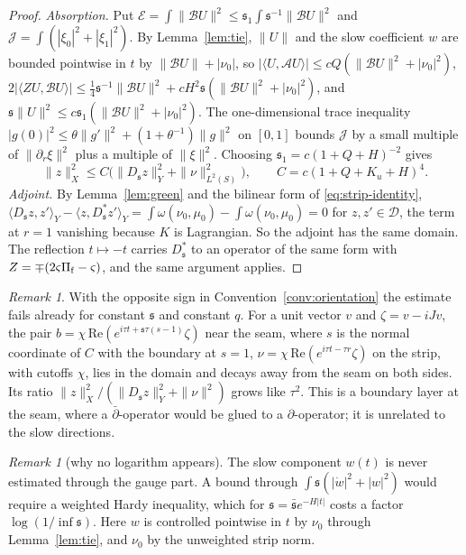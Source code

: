 \documentclass[11pt]{amsart}
\theoremstyle{definition}
\theoremstyle{remark}
\newtheorem{remark}[theorem]{Remark}
\theoremstyle{plain}
\numberwithin{equation}{section}
\begin{document}
\begin{proof}
\emph{Absorption.} Put $\mathcal E=\int\|\mathcal BU\|^2\le{\mathfrak s}_1\int
{\mathfrak s}^{-1}\|\mathcal BU\|^2$ and $\mathcal J=\int(|\xi_0|^2+|\xi_1|^2)$.
By Lemma~\ref{lem:tie}, $\|U\|$ and the slow coefficient $w$ are bounded
pointwise in $t$ by $\|\mathcal BU\|+|\nu_0|$, so
$|\langle U,\mathcal AU\rangle|\le cQ(\|\mathcal BU\|^2+|\nu_0|^2)$,
$2|\langle ZU,\mathcal BU\rangle|\le\tfrac14{\mathfrak s}^{-1}\|\mathcal BU\|^2
+cH^2{\mathfrak s}(\|\mathcal BU\|^2+|\nu_0|^2)$, and ${\mathfrak s}\|U\|^2\le
c{\mathfrak s}_1(\|\mathcal BU\|^2+|\nu_0|^2)$. The one-dimensional trace
inequality $|g(0)|^2\le\theta\|g'\|^2+(1+\theta^{-1})\|g\|^2$ on $[0,1]$
bounds $\mathcal J$ by a small multiple of $\|\partial_r\xi\|^2$ plus a
multiple of $\|\xi\|^2$. Choosing ${\mathfrak s}_1=c(1+Q+H)^{-2}$ gives
\[
\|z\|_X^2\le C\bigl(\|D_{\mathfrak s} z\|_Y^2+\|\nu\|_{L^2(S)}^2\bigr),\qquad
C=c(1+Q+K_u+H)^4 .
\]
\emph{Adjoint.} By Lemma~\ref{lem:green} and the bilinear form of
\eqref{eq:strip-identity}, $\langle D_{\mathfrak s} z,z'\rangle_Y-\langle
z,D_{\mathfrak s}^*z'\rangle_Y=\int\omega(\nu_0,\mu_0)-\int\omega(\nu_0,\mu_0)=0$
for $z,z'\in\mathcal D$, the term at $r=1$ vanishing because $K$ is
Lagrangian. So the adjoint has the same domain. The reflection
$t\mapsto-t$ carries $D_{\mathfrak s}^*$ to an operator of the same form with
$Z=\mp(2\varsigma\Pi_{\rm f}-\varsigma)$, and the same argument applies.
\end{proof}

\begin{remark}\label{rem:wrong-sign}
With the opposite sign in Convention~\ref{conv:orientation} the
estimate fails already for constant ${\mathfrak s}$ and constant $q$. For a
unit vector $v$ and $\zeta=v-iJv$, the pair
$b=\chi\,\mathrm{Re}(e^{i\tau t+{\mathfrak s}\tau(s-1)}\zeta)$ near the seam, where $s$ is the
normal coordinate of $C$ with the boundary at $s=1$,
$\nu=\chi\,\mathrm{Re}(e^{i\tau t-\tau r}\zeta)$ on the strip, with
cutoffs $\chi$, lies in the domain and decays away from the seam on both
sides. Its ratio $\|z\|_X^2/(\|D_{\mathfrak s} z\|_Y^2+\|\nu\|^2)$ grows like
$\tau^2$. This is a boundary layer at the seam, where a
$\bar\partial$-operator would be glued to a $\partial$-operator; it is
unrelated to the slow directions.
\end{remark}

\begin{remark}[why no logarithm appears]\label{rem:no-log}
The slow component $w(t)$ is never estimated through the gauge part. A
bound through $\int{\mathfrak s}(|\dot w|^2+|w|^2)$ would require a weighted
Hardy inequality, which for ${\mathfrak s}=\bar{\mathfrak s} e^{-H|t|}$ costs a factor
$\log(1/\inf{\mathfrak s})$. Here $w$ is controlled pointwise in $t$ by
$\nu_0$ through Lemma~\ref{lem:tie}, and $\nu_0$ by the unweighted strip
norm.
\end{remark}
\end{document}
